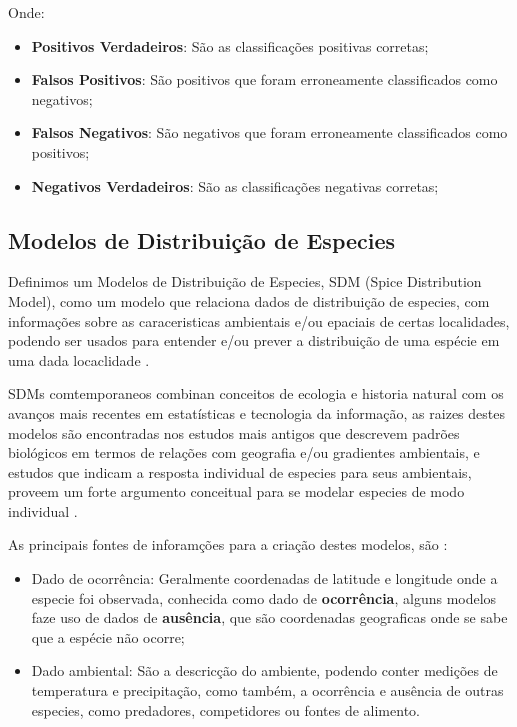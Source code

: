 \documentclass[
	12pt,				%
	openright,			%
	oneside,			%
	a4paper,			%
	english,			%
	brazil				%
	]{abntex2}
\begin{document}
Onde:
\begin{itemize}
	\item \textbf{Positivos Verdadeiros}: São as classificações positivas corretas;
	\item \textbf{Falsos Positivos}: São positivos que foram erroneamente classificados como negativos;
	\item \textbf{Falsos Negativos}: São negativos que foram erroneamente classificados como positivos;
	\item \textbf{Negativos Verdadeiros}: São as classificações negativas corretas;
\end{itemize}

\subsection{Modelos de Distribuição de Especies}

Definimos um Modelos de Distribuição de Especies, SDM (Spice Distribution Model), como um modelo que relaciona dados de 
distribuição de especies, com informações sobre as caraceristicas ambientais e/ou epaciais de certas localidades, podendo 
ser usados para entender e/ou prever a distribuição de uma espécie em uma dada locaclidade \cite{speciesDistributionModels}.

SDMs comtemporaneos combinan conceitos de ecologia e historia natural com os avanços mais recentes em estatísticas e
tecnologia da informação, as raizes destes modelos são encontradas nos estudos mais antigos que descrevem padrões
biológicos em termos de relações com geografia e/ou gradientes ambientais, e estudos que indicam a resposta individual
de especies para seus ambientais, proveem um forte argumento conceitual para se modelar especies de modo individual 
\cite{speciesDistributionModels}.

As principais fontes de inforamções para a criação destes modelos, são \cite{tiposDados_sdm}: 
\begin{itemize}
	\item Dado de ocorrência: Geralmente coordenadas de latitude e longitude onde a especie foi observada, conhecida como
	dado de \textbf{ocorrência}, alguns modelos faze uso de dados de \textbf{ausência}, que são coordenadas geograficas 
	onde se sabe que a espécie não ocorre;
	\item Dado ambiental: São a descricção do ambiente, podendo conter medições de temperatura e precipitação, como
	também, a ocorrência e ausência de outras especies, como predadores, competidores ou fontes de alimento.
\end{itemize}
\end{document}
